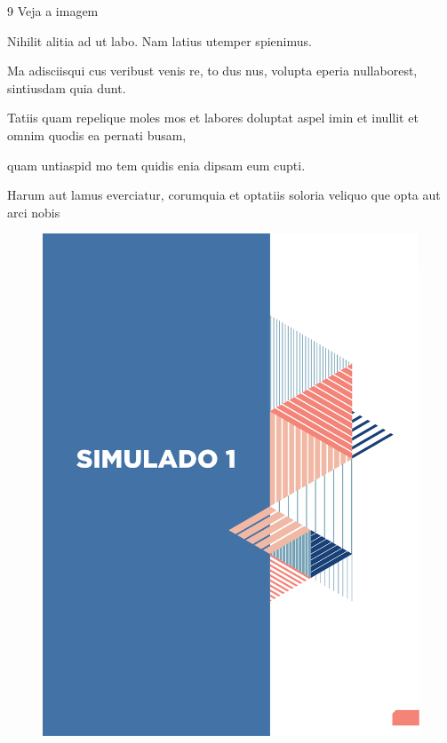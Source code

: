 \num{9} Veja a imagem


Nihilit alitia ad ut labo. Nam latius utemper spienimus.

\begin{boxlist}
\item Ma adisciisqui cus veribust venis re, to dus nus, volupta eperia nullaborest,
sintiusdam quia dunt.
\item Tatiis quam repelique moles mos et labores doluptat aspel imin et inullit et
omnim quodis ea pernati busam,
\item quam untiaspid mo tem quidis enia dipsam eum cupti.
\item Harum aut lamus everciatur, corumquia et optatiis soloria veliquo que opta
aut arci nobis
\end{boxlist}

\pagebreak

\begin{figure}[htpb!]
\vspace*{-3cm}
\hspace*{-3.5cm}\includegraphics[scale=1]{./simulado.pdf}
\end{figure}

